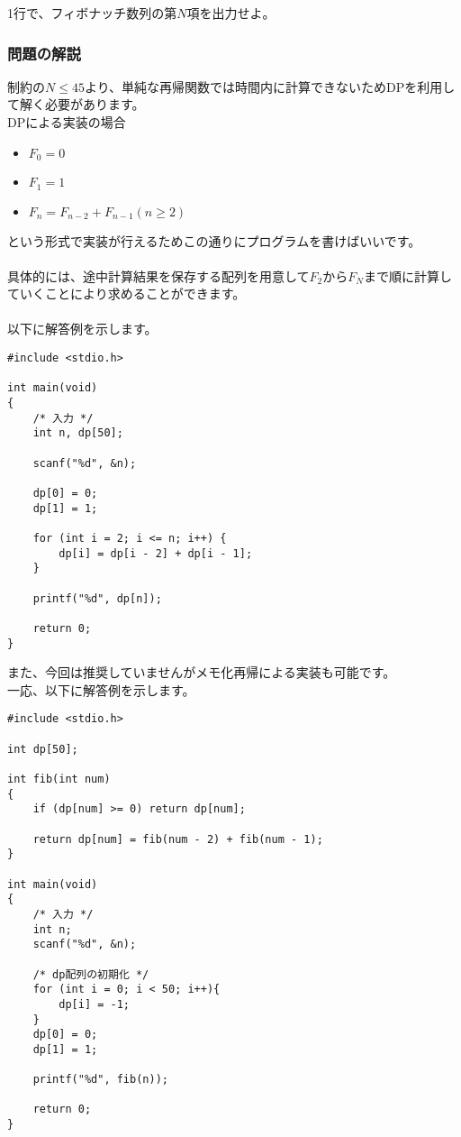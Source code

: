 \noindent
1行で、フィボナッチ数列の第$N$項を出力せよ。

\clearpage

\subsubsection{問題の解説}

\noindent
制約の$N\leq45$より、単純な再帰関数では時間内に計算できないためDPを利用して解く必要があります。\\
DPによる実装の場合

\begin{itemize}
    \item $F_0 = 0$
    \item $F_1 = 1$
    \item $F_{n} = F_{n-2} + F_{n-1} (n \geq 2)$
\end{itemize}

\noindent
という形式で実装が行えるためこの通りにプログラムを書けばいいです。
\\ \\ \noindent
具体的には、途中計算結果を保存する配列を用意して$F_2$から$F_N$まで順に計算していくことにより求めることができます。
\\ \\ \noindent
以下に解答例を示します。

\noindent
\begin{lstlisting}[style = customC]
#include <stdio.h>

int main(void) 
{
    /* 入力 */
    int n, dp[50];

    scanf("%d", &n);

    dp[0] = 0;
    dp[1] = 1;

    for (int i = 2; i <= n; i++) {
        dp[i] = dp[i - 2] + dp[i - 1];
    }

    printf("%d", dp[n]);

    return 0;
}
\end{lstlisting}

\clearpage
\noindent
また、今回は推奨していませんがメモ化再帰による実装も可能です。\\
一応、以下に解答例を示します。

\noindent
\begin{lstlisting}[style = customC]
#include <stdio.h>

int dp[50];

int fib(int num)
{
    if (dp[num] >= 0) return dp[num];

    return dp[num] = fib(num - 2) + fib(num - 1);
}

int main(void) 
{
    /* 入力 */
    int n;
    scanf("%d", &n);

    /* dp配列の初期化 */
    for (int i = 0; i < 50; i++){
        dp[i] = -1;
    }
    dp[0] = 0;
    dp[1] = 1;

    printf("%d", fib(n));

    return 0;
}
\end{lstlisting}

